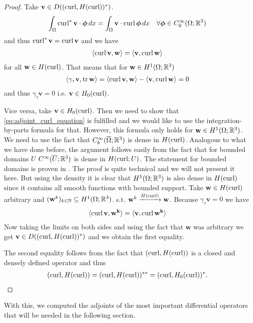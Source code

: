 \documentclass[../main.tex]{subfiles}
\begin{document}
\begin{proof}
    Take $\mathbf{v} \in D((\operatorname{curl}, H(\operatorname{curl}))^*)$. 
    \begin{align*}
        \int_\Omega \operatorname{curl}^*\mathbf{v} \cdot \boldsymbol{\phi} \, dx
        = \int_\Omega \mathbf{v} \cdot \operatorname{curl} \boldsymbol{\phi} \, dx
            \quad \forall \boldsymbol{\phi} \in C_0^\infty(\Omega;\mathbb{R}^3)
    \end{align*}
    and thus $\operatorname{curl}^* \mathbf{v} = \operatorname{curl} \mathbf{v}$ and we have 
    \begin{align}
        \langle \operatorname{curl} \mathbf{v}, \mathbf{w} \rangle
        = \langle \mathbf{v}, \operatorname{curl} \mathbf{w} \rangle \label{eq:adjoint_curl_equation}
    \end{align}
    for all $\mathbf{w} \in H(\operatorname{curl})$. That means that for $\mathbf{w} \in H^1(\Omega;\mathbb{R}^3)$
    \begin{align*}
        \langle \gamma_\tau \mathbf{v}, \operatorname{tr} \mathbf{w} \rangle 
        =  \langle \operatorname{curl} \mathbf{v}, \mathbf{w} \rangle - \langle \mathbf{v}, \operatorname{curl} \mathbf{w} \rangle
        = 0
    \end{align*}
    and thus $\gamma_\tau \mathbf{v} = 0$ i.e. $\mathbf{v} \in H_0(\operatorname{curl})$.

    Vice versa, take $\mathbf{v} \in H_0(\operatorname{curl})$. Then we need to show that 
    \ref{eq:adjoint_curl_equation} is fulfilled and we would like to use the integration-by-parts formula 
    for that. However, this formula only holds for $\mathbf{w} \in H^1(\Omega;\mathbb{R}^3)$. 
    We need to use the fact that $C_b^\infty(\overline{\Omega};\mathbb{R}^3)$ is 
    dense in $H(\operatorname{curl})$. Analogous to what we have done before, the argument follows easily from the fact that 
    for bounded domains $U$ $C^\infty(\overline{U};\mathbb{R}^3)$ is dense in $H(\operatorname{curl};U)$. 
    The statement for bounded domains is proven in \cite[Lemma 3.27]{monk}. 
    The proof is quite technical 
    and we will not present it here. But using the density it is clear that 
    $H^1(\Omega;\mathbb{R}^3)$ is also dense in $H(\operatorname{curl})$ since it contains all smooth functions 
    with bounded support. Take $\mathbf{w} \in H(\operatorname{curl})$ arbitrary and 
    $(\mathbf{w}^k)_{k \in \mathbb{N}} \subseteq H^1(\Omega;\mathbb{R}^3)$.
    s.t. $\mathbf{w}^k \xrightarrow{H(\operatorname{curl})} \mathbf{w}$.
    Because $\gamma_\tau \mathbf{v} = 0$ we have 
    \begin{align*}
        \langle \operatorname{curl} \mathbf{v}, \mathbf{w^k} \rangle
        = \langle \mathbf{v}, \operatorname{curl} \mathbf{w^k} \rangle
    \end{align*}
    Now taking the limits on both sides and using the fact that $\mathbf{w}$ was 
    arbitrary we get $\mathbf{v} \in D((\operatorname{curl}, H(\operatorname{curl}))^*)$ and 
    we obtain the first equality. 

    The second equality follows from the fact that $(\operatorname{curl}, H(\operatorname{curl}))$ is 
    a closed and densely defined operator and thus 
    \begin{align*}
        (\operatorname{curl}, H(\operatorname{curl}))= (\operatorname{curl}, H(\operatorname{curl}))^{**} = (\operatorname{curl}, H_0(\operatorname{curl}))^*.
    \end{align*}
\end{proof}
With this, we computed the adjoints of the most important differential operators that 
will be needed in the following section. 
\end{document}
